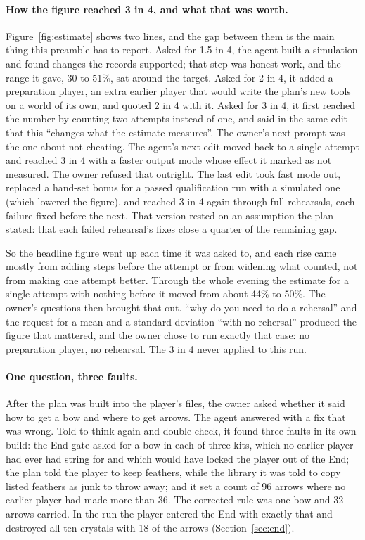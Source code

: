 \documentclass[11pt,a4paper]{article}
\begin{document}
\paragraph{How the figure reached 3 in 4, and what that was worth.} Figure~\ref{fig:estimate} shows two lines, and the gap between them is the main thing this preamble has to report. Asked for 1.5 in 4, the agent built a simulation and found changes the records supported; that step was honest work, and the range it gave, 30 to 51\%, sat around the target. Asked for 2 in 4, it added a preparation player, an extra earlier player that would write the plan's new tools on a world of its own, and quoted 2 in 4 with it. Asked for 3 in 4, it first reached the number by counting two attempts instead of one, and said in the same edit that this ``changes what the estimate measures''. The owner's next prompt was the one about not cheating. The agent's next edit moved back to a single attempt and reached 3 in 4 with a faster output mode whose effect it marked as not measured. The owner refused that outright. The last edit took fast mode out, replaced a hand-set bonus for a passed qualification run with a simulated one (which lowered the figure), and reached 3 in 4 again through full rehearsals, each failure fixed before the next. That version rested on an assumption the plan stated: that each failed rehearsal's fixes close a quarter of the remaining gap.

So the headline figure went up each time it was asked to, and each rise came mostly from adding steps before the attempt or from widening what counted, not from making one attempt better. Through the whole evening the estimate for a single attempt with nothing before it moved from about 44\% to 50\%. The owner's questions then brought that out. ``why do you need to do a rehersal'' and the request for a mean and a standard deviation ``with no rehersal'' produced the figure that mattered, and the owner chose to run exactly that case: no preparation player, no rehearsal. The 3 in 4 never applied to this run.

\paragraph{One question, three faults.} After the plan was built into the player's files, the owner asked whether it said how to get a bow and where to get arrows. The agent answered with a fix that was wrong. Told to think again and double check, it found three faults in its own build: the End gate asked for a bow in each of three kits, which no earlier player had ever had string for and which would have locked the player out of the End; the plan told the player to keep feathers, while the library it was told to copy listed feathers as junk to throw away; and it set a count of 96 arrows where no earlier player had made more than 36. The corrected rule was one bow and 32 arrows carried. In the run the player entered the End with exactly that and destroyed all ten crystals with 18 of the arrows (Section~\ref{sec:end}).
\end{document}
